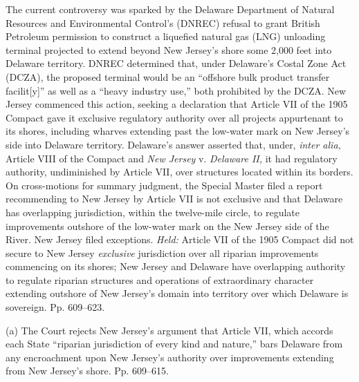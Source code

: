   The current controversy was sparked by the Delaware Department of
Natural Resources and Environmental Control's (DNREC) refusal to
grant British Petroleum permission to construct a liquefied natural
gas (LNG) unloading terminal projected to extend beyond New Jersey's
shore some 2,000 feet into Delaware territory. DNREC determined that,
under Delaware's Costal Zone Act (DCZA), the proposed terminal would
be an ``offshore bulk product transfer facilit[y]'' as well as a
``heavy industry use,'' both prohibited by the DCZA. New Jersey
commenced this action, seeking a declaration that Article VII of
the 1905 Compact gave it exclusive regulatory authority over all
projects appurtenant to its shores, including wharves extending past
the low-water mark on New Jersey's side into Delaware territory.
Delaware's answer asserted that, under, \emph{inter alia,} Article VIII
of the Compact and \emph{New Jersey} v. \emph{Delaware II,} it had regulatory
authority, undiminished by Article VII, over structures located within
its borders. On cross-motions for summary judgment, the Special Master
filed a report recommending \newpage  to New Jersey by Article VII is not
exclusive and that Delaware has overlapping jurisdiction, within the
twelve-mile circle, to regulate improvements outshore of the low-water
mark on the New Jersey side of the River. New Jersey filed exceptions.
\emph{Held:} Article VII of the 1905 Compact did not secure to New Jersey
\emph{exclusive} jurisdiction over all riparian improvements commencing
on its shores; New Jersey and Delaware have overlapping authority to
regulate riparian structures and operations of extraordinary character
extending outshore of New Jersey's domain into territory over which
Delaware is sovereign. Pp. 609--623.

  (a) The Court rejects New Jersey's argument that Article VII, which
accords each State ``riparian jurisdiction of every kind and nature,''
bars Delaware from any encroachment upon New Jersey's authority over
improvements extending from New Jersey's shore. Pp. 609--615.

